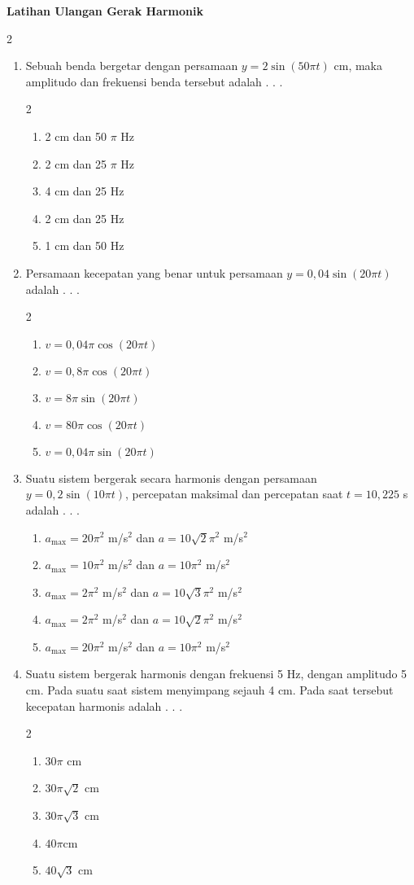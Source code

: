 \documentclass[10pt,a4paper]{extarticle}
\newcommand*\pilgan[1]{
\begin{enumerate}[label=\Alph*., itemsep=0pt,topsep=0pt,leftmargin=*,align=Center] #1 
\end{enumerate}}
\newcommand{\pilgani}[1]{                            \vspace{-0.3cm}\begin{multicols}{2}
 \begin{enumerate}[label=\Alph*., itemsep=0pt,topsep=0pt,leftmargin=*,align=Center]#1                     \end{enumerate}
 \phantom{ini cuma sapi, wedus, dan ayam}
 \end{multicols}}
\begin{document}
 \textbf{Latihan Ulangan Gerak Harmonik} \phantom{ini nama siswa yang aaamengerjakan soal kuis ini }  

\begin{multicols*}{2}\raggedcolumns

\begin{enumerate}
\item Sebuah benda bergetar dengan persamaan $y=2\sin(50\pi t)$ cm, maka amplitudo dan frekuensi benda tersebut adalah . . .
\pilgani{
   \item 2 cm dan 50 $\pi$ Hz
   \item 2 cm dan 25 $\pi$ Hz
   \item 4 cm dan 25 Hz
   \item 2 cm dan 25 Hz
   \item 1 cm dan 50 Hz}
\vspace{2cm}

\item Persamaan kecepatan yang benar untuk persamaan $y=0,04 \sin (20\pi t)$ adalah . . .
\pilgani{
   \item $v=0,04 \pi \cos (20\pi t)$
   \item $v=0,8 \pi \cos (20\pi t)$
   \item $v=8 \pi \sin (20\pi t)$
   \item $v=80 \pi \cos (20\pi t)$
   \item $v=0,04\pi \sin (20\pi t)$}
\vspace{2cm}

\item Suatu sistem bergerak secara harmonis dengan persamaan $y=0,2 \sin (10\pi t)$, percepatan maksimal dan percepatan saat $t = 10,225$ s adalah . . .
\pilgan{
   \item $a_\text{max} = 20 \pi^2$ m/s$^2$ dan $a=10\sqrt{2}\pi^2$ m/s$^2$ 
   \item $a_\text{max} = 10 \pi^2$ m/s$^2$ dan $a=10\pi^2$ m/s$^2$ 
   \item $a_\text{max} = 2 \pi^2$ m/s$^2$ dan $a=10\sqrt{3}\pi^2$ m/s$^2$ 
   \item $a_\text{max} = 2 \pi^2$ m/s$^2$  dan $a=10\sqrt{2}\pi^2$ m/s$^2$ 
   \item $a_\text{max} = 20 \pi^2$ m/s$^2$ dan $a=10\pi^2$ m/s$^2$ }
\vspace{3cm}

\item Suatu sistem bergerak harmonis dengan frekuensi 5 Hz, dengan amplitudo 5 cm. Pada suatu saat sistem menyimpang sejauh 4 cm. Pada saat tersebut kecepatan harmonis adalah . . . 
\pilgani{
   \item $30\pi$ cm
   \item $30\pi \sqrt{2}$ cm
   \item $30\pi \sqrt{3}$ cm
   \item $40\pi$cm
   \item $40\sqrt{3}$ cm
}
\vspace{4cm}



\end{enumerate}
\end{multicols*}
\end{document}
